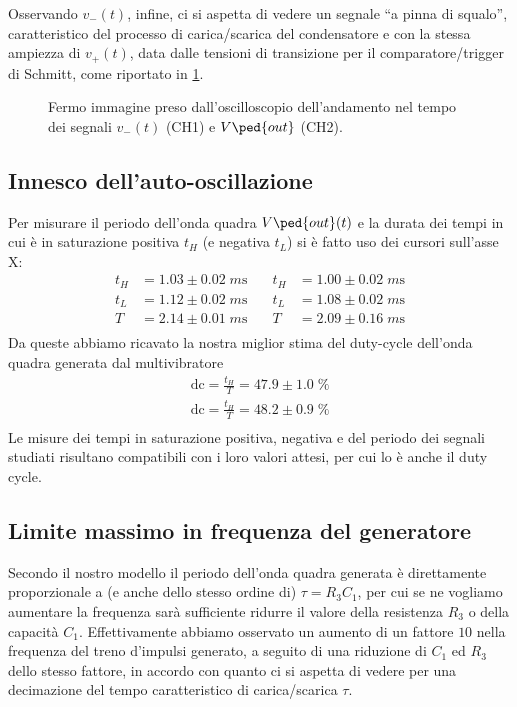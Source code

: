 \documentclass[10pt, a4paper, italian]{article}
\begin{document}
Osservando $v_- (t)$, infine, ci si aspetta di vedere un segnale ``a pinna di
squalo'', caratteristico del processo di carica/scarica del condensatore e
con la stessa ampiezza di $v_+ (t)$, data dalle tensioni di transizione per
il comparatore/trigger di Schmitt, come riportato in \cref{fig: v-vout}.
\begin{figure}[htbp]
	\centering
	\caption{Fermo immagine preso dall'oscilloscopio dell'andamento nel tempo dei
	segnali $v_- (t)$ (CH1) e $V\ped{out}$ (CH2). \label{fig: v-vout}}
\end{figure}

\subsection{Innesco dell'auto-oscillazione}
Per misurare il periodo dell'onda quadra $V\ped{out} (t)$ e la durata dei
tempi in cui è in saturazione positiva $t_H$ (e negativa $t_L$) si è fatto
uso dei cursori sull'asse X:
\begin{align*}
t_H &= 1.03 \pm 0.02 \; \si{m\s} &\quad t_H &= 1.00 \pm 0.02 \; \si{m\s} \\
t_L &= 1.12 \pm 0.02 \; \si{m\s} &\quad t_L &= 1.08 \pm 0.02 \; \si{m\s} \\
T &= 2.14 \pm 0.01 \; \si{m\s}  &\quad T &= 2.09 \pm 0.16 \; \si{m\s} \\
\end{align*}
Da queste abbiamo ricavato la nostra miglior stima del duty-cycle dell'onda
quadra generata dal multivibratore
\begin{align*}
\mathrm{dc} = \frac{t_H}{T} = 47.9 \pm 1.0 \; \% \\
\mathrm{dc} = \frac{t_H}{T} = 48.2 \pm 0.9 \; \% \\
\end{align*}
Le misure dei tempi in saturazione positiva, negativa e del periodo dei
segnali studiati risultano compatibili con i loro valori attesi, per cui
lo è anche il duty cycle.

\subsection{Limite massimo in frequenza del generatore}
Secondo il nostro modello il periodo dell'onda quadra generata è direttamente
proporzionale a (e anche dello stesso ordine di) $\tau = R_3 C_1$, per cui
se ne vogliamo aumentare la frequenza sarà sufficiente ridurre il valore
della resistenza $R_3$ o della capacità $C_1$. Effettivamente abbiamo osservato
un aumento di un fattore $10$ nella frequenza del treno d'impulsi generato,
a seguito di una riduzione di $C_1$ ed $R_3$ dello stesso fattore, in accordo
con quanto ci si aspetta di vedere per una decimazione del tempo caratteristico
di carica/scarica $\tau$.
\end{document}
